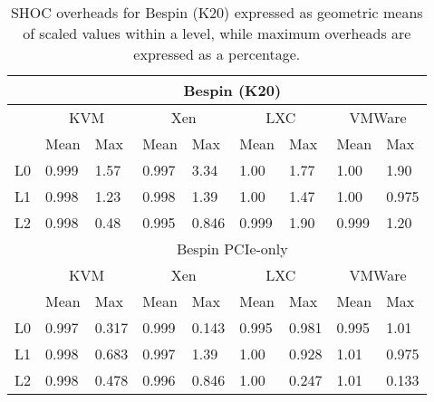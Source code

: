\begin{table*}
\footnotesize
\caption{SHOC overheads for Bespin (K20) expressed as geometric means of scaled values within a
level, while maximum overheads are expressed as a percentage.  }
\label{K20MEANS}
\centering
    \begin{tabular}{|l|l|l|l|l|l|l|l|l|}
    \hline 
    ~  & \multicolumn{8}{c|}{Bespin (K20)} \\ \hline
    ~  & \multicolumn{2}{c|}{KVM} & \multicolumn{2}{c|}{Xen} & \multicolumn{2}{c|}{LXC} & \multicolumn{2}{c|}{VMWare} \\ \hline 
    ~  & Mean   & Max & Mean & Max & Mean & Max & Mean & Max \\ \hline 
    L0 & 0.999   & 1.57   & 0.997 & 3.34   & 1.00   & 1.77  & 1.00  & 1.90     \\ \hline 
    L1 & 0.998   & 1.23   & 0.998 & 1.39   & 1.00   & 1.47  & 1.00  & 0.975   \\ \hline 
    L2 & 0.998   & 0.48   & 0.995 & 0.846  & 0.999  & 1.90  & 0.999 & 1.20   \\ \hline
    ~  & \multicolumn{8}{c|}{Bespin PCIe-only}  \\ \hline
    ~  & \multicolumn{2}{c|}{KVM} & \multicolumn{2}{c|}{Xen} & \multicolumn{2}{c|}{LXC} & \multicolumn{2}{c|}{VMWare}  \\ \hline 
    ~  & Mean   & Max & Mean & Max & Mean & Max & Mean & Max \\ \hline 
    L0 & 0.997   & 0.317   & 0.999  & 0.143 & 0.995  & 0.981  & 0.995 & 1.01      \\ \hline 
    L1 & 0.998   & 0.683   & 0.997  & 1.39  & 1.00   & 0.928  & 1.01  & 0.975   \\ \hline 
    L2 & 0.998   & 0.478   & 0.996  & 0.846 & 1.00   & 0.247  & 1.01  & 0.133    \\ \hline
    \end{tabular}
\end{table*}

